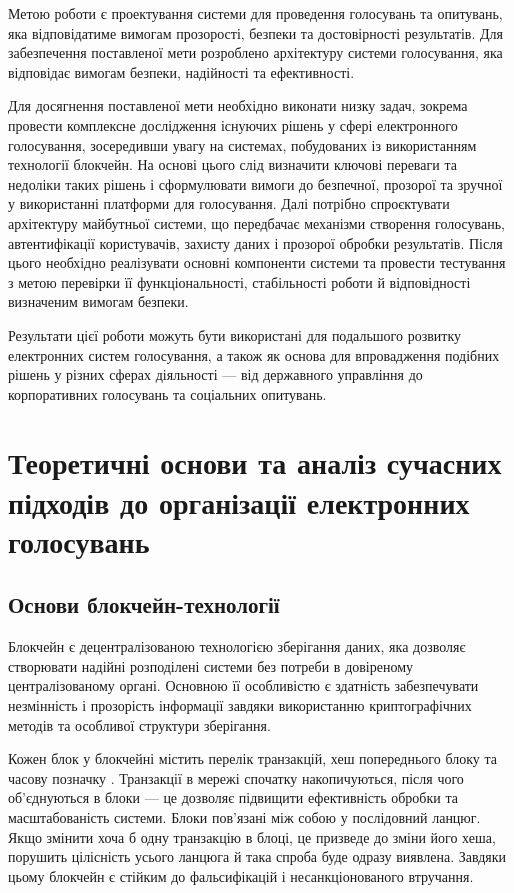\documentclass[14pt]{extreport}
\begin{document}
  Метою роботи є проектування системи для проведення голосувань та опитувань, яка відповідатиме вимогам прозорості, безпеки та достовірності результатів. Для забезпечення поставленої мети розроблено архітектуру системи голосування, яка відповідає вимогам безпеки, надійності та ефективності.

  Для досягнення поставленої мети необхідно виконати низку задач, зокрема провести комплексне дослідження існуючих рішень у сфері електронного голосування, зосередивши увагу на системах, побудованих із використанням технології блокчейн. На основі цього слід визначити ключові переваги та недоліки таких рішень і сформулювати вимоги до безпечної, прозорої та зручної у використанні платформи для голосування. Далі потрібно спроєктувати архітектуру майбутньої системи, що передбачає механізми створення голосувань, автентифікації користувачів, захисту даних і прозорої обробки результатів. Після цього необхідно реалізувати основні компоненти системи та провести тестування з метою перевірки її функціональності, стабільності роботи й відповідності визначеним вимогам безпеки.

  Результати цієї роботи можуть бути використані для подальшого розвитку електронних систем голосування, а також як основа для впровадження подібних рішень у різних сферах діяльності — від державного управління до корпоративних голосувань та соціальних опитувань.
  
  \chapter{Теоретичні основи та аналіз сучасних підходів до організації електронних голосувань}
  
  \section{Основи блокчейн-технології}

  Блокчейн є децентралізованою технологією зберігання даних, яка дозволяє створювати надійні розподілені системи без потреби в довіреному централізованому органі. Основною її особливістю є здатність забезпечувати незмінність і прозорість інформації завдяки використанню криптографічних методів та особливої структури зберігання.

  Кожен блок у блокчейні містить перелік транзакцій, хеш попереднього блоку та часову позначку \cite{blockchain}. Транзакції в мережі спочатку накопичуються, після чого об'єднуються в блоки — це дозволяє підвищити ефективність обробки та масштабованість системи. Блоки пов'язані між собою у послідовний ланцюг. Якщо змінити хоча б одну транзакцію в блоці, це призведе до зміни його хеша, порушить цілісність усього ланцюга й така спроба буде одразу виявлена. Завдяки цьому блокчейн є стійким до фальсифікацій і несанкціонованого втручання.
\end{document}
